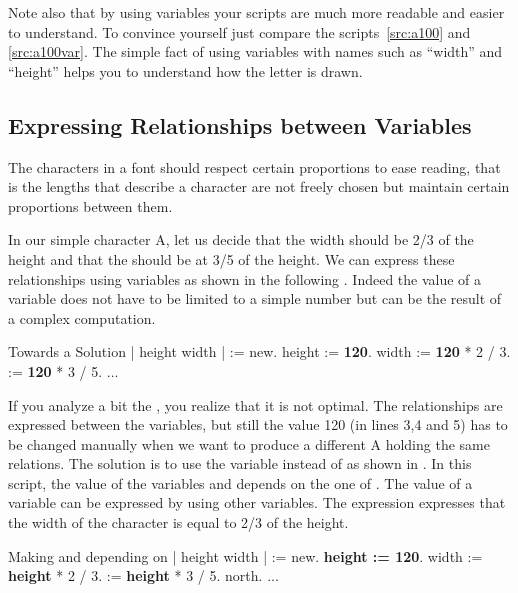 Note also that by using variables your scripts are much more readable and easier to understand. To convince yourself just compare the scripts~\ref{src:a100} and \ref{src:a100var}.  The simple fact of using variables with names such as ``width'' and ``height'' helps you to understand how the letter is drawn. 

\subsection{Expressing Relationships between Variables}
The characters in a font should respect certain proportions to ease reading, that is the lengths that describe a character are not freely chosen but maintain certain proportions between them. 

In our simple character A, let us decide that the width should be 2/3 of the height and that the \dist should be at 3/5 of the height. We can express these relationships using variables as shown in the following . Indeed the value of a variable does not have to be  limited to a simple number but can be the result of a complex computation. 

\begin{scriptwithtitle}{Towards a Solution}\label{src:a100varl}
| \caro height width \dist|
\caro := \Turtle new.
height := \textbf{120}.
width := \textbf{120} * 2 / 3.
\dist := \textbf{120} * 3 / 5.
...
\end{scriptwithtitle}

If you analyze a bit the , you realize that it is not optimal. The relationships are expressed between the variables, but still the value 120 (in lines 3,4 and 5) has to be changed manually when we want to produce a different A holding the same relations.  The solution is to use the variable  instead of  as shown in . In this script, the value of the variables  and \ct{\dist} depends on the one of . The value of a variable can be expressed by using other variables. The expression  expresses that the width of the character is equal to 2/3 of the height.

\begin{scriptwithtitle}{Making  and \ct{\dist} depending on }\label{src:a100varwl}
| \caro height width \dist|
\caro := \Turtle new.
\textbf{height := 120}.
width := \textbf{height} * 2 / 3.
\dist := \textbf{height} * 3 / 5.
\caro north.
...
\end{scriptwithtitle}


